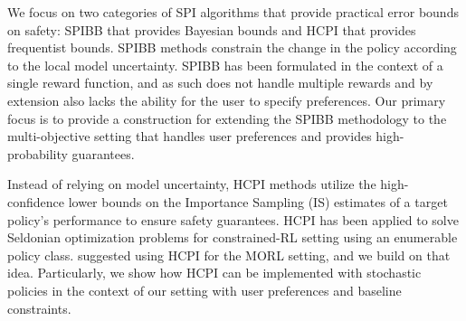 We focus on two categories of SPI algorithms that provide practical error bounds on safety: SPIBB \citep{laroche2017safe} that provides Bayesian bounds and HCPI \citep{thomas2015highImprovement, thomas2015highEvaluation} that provides frequentist bounds.
SPIBB methods constrain the change in the policy according to the local model uncertainty. 
SPIBB has been formulated in the context of a single reward function, and as such does not handle multiple rewards and by extension also lacks the ability for the user to specify preferences. 
Our primary focus is to provide a construction for extending the SPIBB methodology to the multi-objective setting that handles user preferences and provides high-probability guarantees.

Instead of relying on model uncertainty, HCPI methods utilize the high-confidence lower bounds on the Importance Sampling (IS) estimates of a target policy's performance to ensure safety guarantees. 
HCPI has been applied to solve Seldonian optimization problems for constrained-RL setting using an enumerable policy class. \citet{Thomas2019} suggested using HCPI for the MORL setting, and we build on that idea. Particularly, we show how HCPI can be implemented with stochastic policies in the context of our setting with user preferences and baseline constraints.

